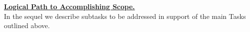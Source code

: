 
\vspace*{.08in}\noindent \underline{\textbf{ 
              Logical Path to Accomplishing Scope.}} \\[-2ex]



In the sequel we describe subtasks to be addressed in support of the
main Tasks outlined above.
\\[-2ex]








% 
% 

